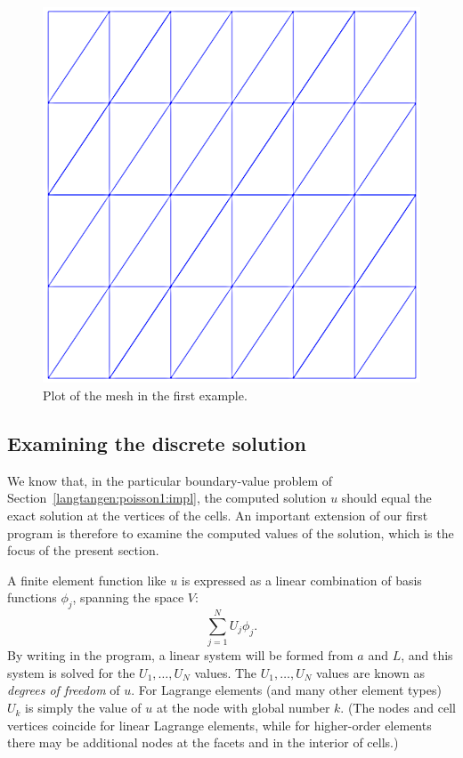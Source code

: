 \begin{figure}
  \center\includegraphics[width=\smallfig]{chapters/langtangen/png/ex1_mesh.png}
  \caption{Plot of the mesh in the first \fenics{} example.}
  \label{tut:poisson:2D:fig:ex1:mesh}
\end{figure}

\subsection{Examining the discrete solution}
\label{langtangen:poisson1:verify1}

We know that, in the particular boundary-value problem of
Section~\ref{langtangen:poisson1:impl}, the computed solution $u$ should
equal the exact solution at the vertices of the cells.  An important
extension of our first program is therefore to examine the computed
values of the solution, which is the focus of the present section.

A finite element function like $u$ is expressed as a linear combination
of basis functions $\phi_j$, spanning the space $V$:
\begin{equation}
  \sum_{j=1}^N U_j \phi_j.
\label{langtangen:poisson1:ufem}
\end{equation}
By writing  in the program, a linear system
will be formed from $a$ and $L$, and this system is solved for
the $U_1,\ldots,U_N$ values. The $U_1,\ldots,U_N$ values are known
 as \emph{degrees of freedom} of $u$. For
Lagrange elements (and many other element types) $U_k$ is simply the value
of $u$ at the node with global number $k$.  (The nodes and cell vertices
coincide for linear Lagrange elements, while for higher-order elements
there may be additional nodes at the facets and in the interior of cells.)


